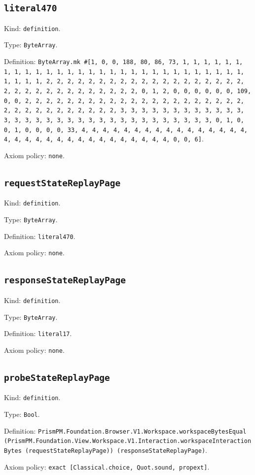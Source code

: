 \documentclass[11pt]{article}
\begin{document}
\subsection*{\texttt{literal470}}
\noindent Kind: \texttt{definition}.\par
\noindent Type: \texttt{ByteArray}.\par
\noindent Definition: \texttt{ByteArray.mk \#[1, 0, 0, 188, 80, 86, 73, 1, 1, 1, 1, 1, 1, 1, 1, 1, 1, 1, 1, 1, 1, 1, 1, 1, 1, 1, 1, 1, 1, 1, 1, 1, 1, 1, 1, 1, 1, 1, 1, 1, 2, 2, 2, 2, 2, 2, 2, 2, 2, 2, 2, 2, 2, 2, 2, 2, 2, 2, 2, 2, 2, 2, 2, 2, 2, 2, 2, 2, 2, 2, 2, 2, 0, 1, 2, 0, 0, 0, 0, 0, 0, 109, 0, 0, 2, 2, 2, 2, 2, 2, 2, 2, 2, 2, 2, 2, 2, 2, 2, 2, 2, 2, 2, 2, 2, 2, 2, 2, 2, 2, 2, 2, 2, 2, 2, 2, 3, 3, 3, 3, 3, 3, 3, 3, 3, 3, 3, 3, 3, 3, 3, 3, 3, 3, 3, 3, 3, 3, 3, 3, 3, 3, 3, 3, 3, 3, 3, 3, 0, 1, 0, 0, 1, 0, 0, 0, 0, 33, 4, 4, 4, 4, 4, 4, 4, 4, 4, 4, 4, 4, 4, 4, 4, 4, 4, 4, 4, 4, 4, 4, 4, 4, 4, 4, 4, 4, 4, 4, 4, 4, 0, 0, 6]}.\par
\noindent Axiom policy: \texttt{none}.\par
\subsection*{\texttt{requestStateReplayPage}}
\noindent Kind: \texttt{definition}.\par
\noindent Type: \texttt{ByteArray}.\par
\noindent Definition: \texttt{literal470}.\par
\noindent Axiom policy: \texttt{none}.\par
\subsection*{\texttt{responseStateReplayPage}}
\noindent Kind: \texttt{definition}.\par
\noindent Type: \texttt{ByteArray}.\par
\noindent Definition: \texttt{literal17}.\par
\noindent Axiom policy: \texttt{none}.\par
\subsection*{\texttt{probeStateReplayPage}}
\noindent Kind: \texttt{definition}.\par
\noindent Type: \texttt{Bool}.\par
\noindent Definition: \texttt{PrismPM.Foundation.Browser.V1.Workspace.workspaceBytesEqual (PrismPM.Foundation.View.Workspace.V1.Interaction.workspaceInteractionBytes (requestStateReplayPage)) (responseStateReplayPage)}.\par
\noindent Axiom policy: \texttt{exact [Classical.choice, Quot.sound, propext]}.\par
\end{document}
